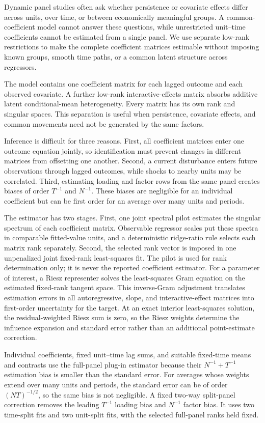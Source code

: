 \documentclass[11pt]{article}
\numberwithin{equation}{section}
\theoremstyle{remark}
\begin{document}
Dynamic panel studies often ask whether persistence or covariate effects differ across units, over time, or between economically meaningful groups. A common-coefficient model cannot answer these questions, while unrestricted unit--time coefficients cannot be estimated from a single panel. We use separate low-rank restrictions to make the complete coefficient matrices estimable without imposing known groups, smooth time paths, or a common latent structure across regressors.

The model contains one coefficient matrix for each lagged outcome and each observed covariate. A further low-rank interactive-effects matrix absorbs additive latent conditional-mean heterogeneity. Every matrix has its own rank and singular spaces. This separation is useful when persistence, covariate effects, and common movements need not be generated by the same factors.

Inference is difficult for three reasons. First, all coefficient matrices enter one outcome equation jointly, so identification must prevent changes in different matrices from offsetting one another. Second, a current disturbance enters future observations through lagged outcomes, while shocks to nearby units may be correlated. Third, estimating loading and factor rows from the same panel creates biases of order $T^{-1}$ and $N^{-1}$. These biases are negligible for an individual coefficient but can be first order for an average over many units and periods.

The estimator has two stages. First, one joint spectral pilot estimates the singular spectrum of each coefficient matrix. Observable regressor scales put these spectra in comparable fitted-value units, and a deterministic ridge-ratio rule selects each matrix rank separately. Second, the selected rank vector is imposed in one unpenalized joint fixed-rank least-squares fit. The pilot is used for rank determination only; it is never the reported coefficient estimator. For a parameter of interest, a Riesz representer solves the least-squares Gram equation on the estimated fixed-rank tangent space. This inverse-Gram adjustment translates estimation errors in all autoregressive, slope, and interactive-effect matrices into first-order uncertainty for the target. At an exact interior least-squares solution, the residual-weighted Riesz sum is zero, so the Riesz weights determine the influence expansion and standard error rather than an additional point-estimate correction.

Individual coefficients, fixed unit--time lag sums, and suitable fixed-time means and contrasts use the full-panel plug-in estimator because their $N^{-1}+T^{-1}$ estimation bias is smaller than the standard error. For averages whose weights extend over many units and periods, the standard error can be of order $(NT)^{-1/2}$, so the same bias is not negligible. A fixed two-way split-panel correction removes the leading $T^{-1}$ loading bias and $N^{-1}$ factor bias. It uses two time-split fits and two unit-split fits, with the selected full-panel ranks held fixed.
\end{document}
